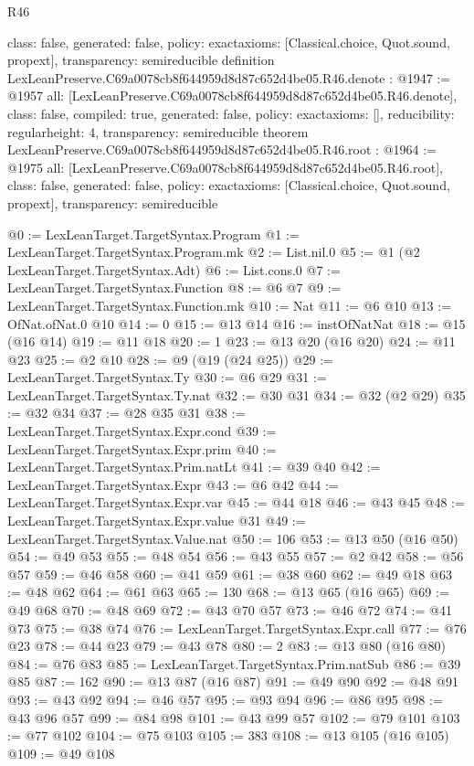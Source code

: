 \begin{lexlean}{R46}
\begin{coremodule}
{  class: false,
  generated: false,
  policy: exact{axioms: [Classical.choice, Quot.sound, propext]},
  transparency: semireducible
}
definition LexLeanPreserve.C69a0078cb8f644959d8d87c652d4be05.R46.denote : @1947 := @1957 {
  all: [LexLeanPreserve.C69a0078cb8f644959d8d87c652d4be05.R46.denote],
  class: false,
  compiled: true,
  generated: false,
  policy: exact{axioms: []},
  reducibility: regular{height: 4},
  transparency: semireducible
}
theorem LexLeanPreserve.C69a0078cb8f644959d8d87c652d4be05.R46.root : @1964 := @1975 {
  all: [LexLeanPreserve.C69a0078cb8f644959d8d87c652d4be05.R46.root],
  class: false,
  generated: false,
  policy: exact{axioms: [Classical.choice, Quot.sound, propext]},
  transparency: semireducible
}

@0 := LexLeanTarget.TargetSyntax.Program
@1 := LexLeanTarget.TargetSyntax.Program.mk
@2 := List.nil.{0}
@5 := @1 (@2 LexLeanTarget.TargetSyntax.Adt)
@6 := List.cons.{0}
@7 := LexLeanTarget.TargetSyntax.Function
@8 := @6 @7
@9 := LexLeanTarget.TargetSyntax.Function.mk
@10 := Nat
@11 := @6 @10
@13 := OfNat.ofNat.{0} @10
@14 := 0
@15 := @13 @14
@16 := instOfNatNat
@18 := @15 (@16 @14)
@19 := @11 @18
@20 := 1
@23 := @13 @20 (@16 @20)
@24 := @11 @23
@25 := @2 @10
@28 := @9 (@19 (@24 @25))
@29 := LexLeanTarget.TargetSyntax.Ty
@30 := @6 @29
@31 := LexLeanTarget.TargetSyntax.Ty.nat
@32 := @30 @31
@34 := @32 (@2 @29)
@35 := @32 @34
@37 := @28 @35 @31
@38 := LexLeanTarget.TargetSyntax.Expr.cond
@39 := LexLeanTarget.TargetSyntax.Expr.prim
@40 := LexLeanTarget.TargetSyntax.Prim.natLt
@41 := @39 @40
@42 := LexLeanTarget.TargetSyntax.Expr
@43 := @6 @42
@44 := LexLeanTarget.TargetSyntax.Expr.var
@45 := @44 @18
@46 := @43 @45
@48 := LexLeanTarget.TargetSyntax.Expr.value @31
@49 := LexLeanTarget.TargetSyntax.Value.nat
@50 := 106
@53 := @13 @50 (@16 @50)
@54 := @49 @53
@55 := @48 @54
@56 := @43 @55
@57 := @2 @42
@58 := @56 @57
@59 := @46 @58
@60 := @41 @59
@61 := @38 @60
@62 := @49 @18
@63 := @48 @62
@64 := @61 @63
@65 := 130
@68 := @13 @65 (@16 @65)
@69 := @49 @68
@70 := @48 @69
@72 := @43 @70 @57
@73 := @46 @72
@74 := @41 @73
@75 := @38 @74
@76 := LexLeanTarget.TargetSyntax.Expr.call
@77 := @76 @23
@78 := @44 @23
@79 := @43 @78
@80 := 2
@83 := @13 @80 (@16 @80)
@84 := @76 @83
@85 := LexLeanTarget.TargetSyntax.Prim.natSub
@86 := @39 @85
@87 := 162
@90 := @13 @87 (@16 @87)
@91 := @49 @90
@92 := @48 @91
@93 := @43 @92
@94 := @46 @57
@95 := @93 @94
@96 := @86 @95
@98 := @43 @96 @57
@99 := @84 @98
@101 := @43 @99 @57
@102 := @79 @101
@103 := @77 @102
@104 := @75 @103
@105 := 383
@108 := @13 @105 (@16 @105)
@109 := @49 @108

\end{coremodule}
\end{lexlean}

